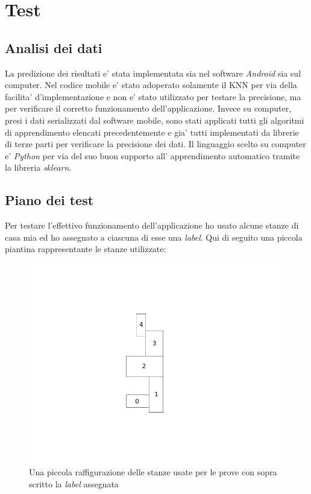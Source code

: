 \chapter{Test}

\section{Analisi dei dati}
La predizione dei risultati e' stata implementata sia nel software \textit{Android} sia sul computer. Nel codice mobile e' stato adoperato solamente il KNN per via della facilita' d'implementazione e non e' stato  utilizzato per testare la precisione, ma per verificare il corretto funzionamento dell'applicazione. Invece su computer, presi i dati serializzati dal software mobile, sono stati applicati tutti gli algoritmi di apprendimento elencati precedentemente e gia' tutti implementati da librerie di terze parti per verificare la precisione dei dati. Il linguaggio scelto su computer e' \textit{Python} per via del suo buon supporto all' apprendimento automatico tramite la libreria \textit{sklearn}.



\section{Piano dei test}
Per testare l'effettivo funzionamento dell'applicazione ho usato alcune stanze di casa mia ed ho assegnato a ciascuna di esse una \textit{label}. Qui di seguito una piccola piantina rappresentante le stanze utilizzate:

\begin{figure}[H]
\centering
\includegraphics[width=0.7\linewidth]{img/test_pianta_casa}
\caption{Una piccola raffigurazione delle stanze usate per le prove con sopra scritto la \textit{label} assegnata}
\label{fig:test_pianta_casa}
\end{figure}

